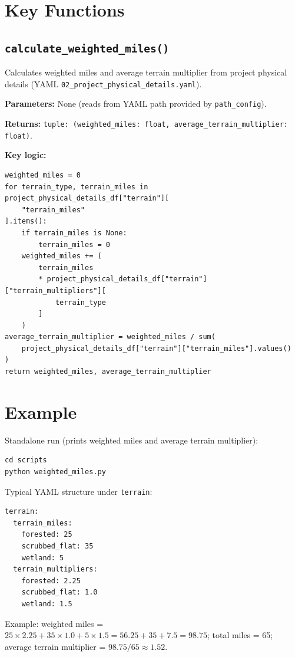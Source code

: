 \documentclass[ctcc_full_documentation.tex]{subfiles}
\begin{document}
\section{Key Functions}

\subsection{\texttt{calculate\_weighted\_miles()}}

Calculates weighted miles and average terrain multiplier from project physical details (YAML \texttt{02\_project\_physical\_details.yaml}).

\textbf{Parameters:} None (reads from YAML path provided by \texttt{path\_config}).

\textbf{Returns:} \texttt{tuple: (weighted\_miles: float, average\_terrain\_multiplier: float)}.

\textbf{Key logic:}
\begin{lstlisting}
weighted_miles = 0
for terrain_type, terrain_miles in project_physical_details_df["terrain"][
    "terrain_miles"
].items():
    if terrain_miles is None:
        terrain_miles = 0
    weighted_miles += (
        terrain_miles
        * project_physical_details_df["terrain"]["terrain_multipliers"][
            terrain_type
        ]
    )
average_terrain_multiplier = weighted_miles / sum(
    project_physical_details_df["terrain"]["terrain_miles"].values()
)
return weighted_miles, average_terrain_multiplier
\end{lstlisting}

\section{Example}

Standalone run (prints weighted miles and average terrain multiplier):
\begin{lstlisting}
cd scripts
python weighted_miles.py
\end{lstlisting}

Typical YAML structure under \texttt{terrain}:
\begin{lstlisting}
terrain:
  terrain_miles:
    forested: 25
    scrubbed_flat: 35
    wetland: 5
  terrain_multipliers:
    forested: 2.25
    scrubbed_flat: 1.0
    wetland: 1.5
\end{lstlisting}
Example: weighted miles = $25 \times 2.25 + 35 \times 1.0 + 5 \times 1.5 = 56.25 + 35 + 7.5 = 98.75$; total miles = 65; average terrain multiplier = $98.75 / 65 \approx 1.52$.
\end{document}
